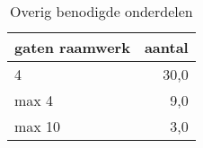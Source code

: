 \begin{table}[h!]
\centering
\caption{Overig benodigde onderdelen}
\begin{tabular}{lr}
\toprule
gaten raamwerk &  aantal \\
\midrule
             4 &    30,0 \\
         max 4 &     9,0 \\
        max 10 &     3,0 \\
\bottomrule
\end{tabular}
\end{table}

